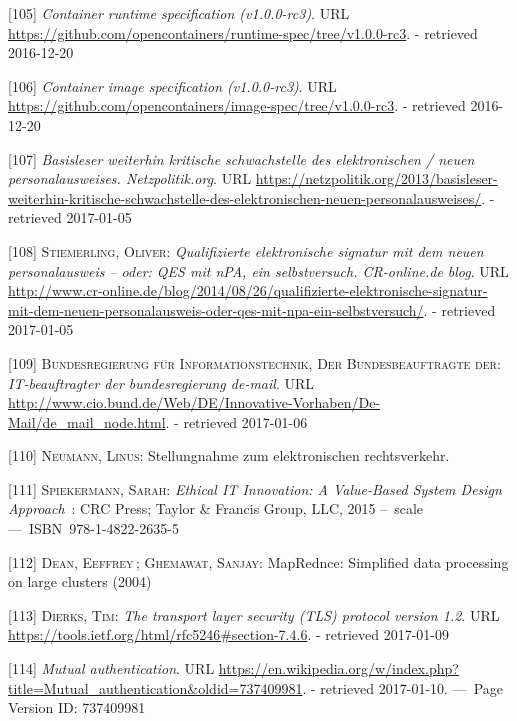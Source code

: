 \documentclass[12pt,english,a4paper,titlepage,cleardoublepage=empty,dottedtoc]{report}
\begin{document}
\hypertarget{ref-web_oci-spec_runtime}{}
{[}105{]} \emph{Container runtime specification (v1.0.0-rc3)}. URL
\url{https://github.com/opencontainers/runtime-spec/tree/v1.0.0-rc3}. -
retrieved 2016-12-20

\hypertarget{ref-web_oci-spec_image}{}
{[}106{]} \emph{Container image specification (v1.0.0-rc3)}. URL
\url{https://github.com/opencontainers/image-spec/tree/v1.0.0-rc3}. -
retrieved 2016-12-20

\hypertarget{ref-web_2013_npa-sicherheitsdefizit}{}
{[}107{]} \emph{Basisleser weiterhin kritische schwachstelle des
elektronischen / neuen personalausweises. Netzpolitik.org}. URL
\url{https://netzpolitik.org/2013/basisleser-weiterhin-kritische-schwachstelle-des-elektronischen-neuen-personalausweises/}.
- retrieved 2017-01-05

\hypertarget{ref-web_2014_test-qes-support-in-npa}{}
{[}108{]} \textsc{Stiemerling, Oliver}: \emph{Qualifizierte
elektronische signatur mit dem neuen personalausweis -- oder: QES mit
nPA, ein selbstversuch. CR-online.de blog}. URL
\url{http://www.cr-online.de/blog/2014/08/26/qualifizierte-elektronische-signatur-mit-dem-neuen-personalausweis-oder-qes-mit-npa-ein-selbstversuch/}.
- retrieved 2017-01-05

\hypertarget{ref-web_2017_about-de-mail}{}
{[}109{]} \textsc{Bundesregierung für Informationstechnik, Der
Bundesbeauftragte der}: \emph{IT-beauftragter der bundesregierung
de-mail}. URL
\url{http://www.cio.bund.de/Web/DE/Innovative-Vorhaben/De-Mail/de_mail_node.html}.
- retrieved 2017-01-06

\hypertarget{ref-statement_2013_de-mail}{}
{[}110{]} \textsc{Neumann, Linus}: Stellungnahme zum elektronischen
rechtsverkehr.

\hypertarget{ref-book_2015_ethical-it-innovation}{}
{[}111{]} \textsc{Spiekermann, Sarah}: \emph{Ethical IT Innovation: A
Value-Based System Design Approach}~: CRC Press; Taylor \& Francis
Group, LLC, 2015 --~scale ---~ISBN~978-1-4822-2635-5

\hypertarget{ref-paper_2004_distributed-mapreduce}{}
{[}112{]} \textsc{Dean, Eeffrey}\,; \textsc{Ghemawat, Sanjay}:
MapRednce: Simplified data processing on large clusters (2004)

\hypertarget{ref-web_spec_tls-12_client-auth}{}
{[}113{]} \textsc{Dierks, Tim}: \emph{The transport layer security (TLS)
protocol version 1.2}. URL
\url{https://tools.ietf.org/html/rfc5246\#section-7.4.6}. - retrieved
2017-01-09

\hypertarget{ref-web_2017_wikipedia_mutual-auth}{}
{[}114{]} \emph{Mutual authentication}. URL
\url{https://en.wikipedia.org/w/index.php?title=Mutual_authentication\&oldid=737409981}.
- retrieved 2017-01-10. ---~Page Version ID: 737409981
\end{document}
